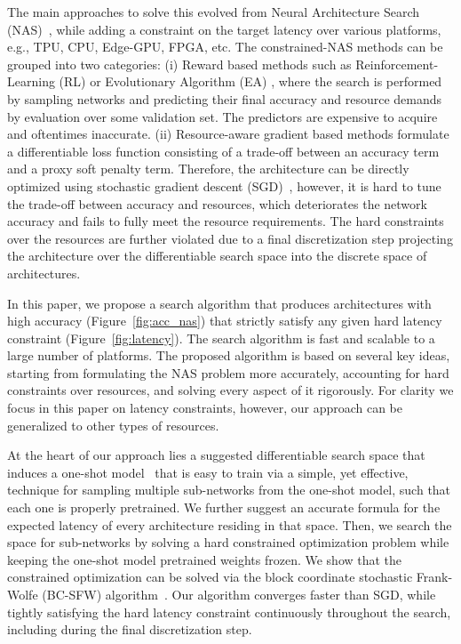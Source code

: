 \documentclass[dvipsnames,table,xcdraw]{article}
\begin{document}
The main approaches to solve this evolved from Neural Architecture Search (NAS)~\cite{zoph2016neural, liu2018darts, cai2018proxylessnas}, while adding a constraint on the target latency over various platforms, e.g., TPU, CPU, Edge-GPU, FPGA, etc. 
The constrained-NAS methods can be grouped into two categories: (i) Reward based methods such as Reinforcement-Learning (RL) or Evolutionary Algorithm (EA) \cite{OFA,tan2019mnasnet, effnet, mobilenetv3}, where the search is performed by sampling networks and predicting their final accuracy and resource demands by evaluation over some validation set. The predictors are expensive to acquire and oftentimes inaccurate. (ii) Resource-aware gradient based methods \cite{TF-NAS,fbnet} formulate a differentiable loss function consisting of a trade-off between an accuracy term and a proxy soft penalty term. Therefore, the architecture can be directly optimized using stochastic gradient descent (SGD)~\cite{SGD}, however, it is hard to tune the trade-off between accuracy and resources, which deteriorates the network accuracy and fails to fully meet the resource requirements. 
The hard constraints over the resources are further violated due to a final discretization step projecting the architecture over the differentiable search space into the discrete space of architectures.
 
In this paper, we propose a search algorithm that produces architectures with high accuracy (Figure~\ref{fig:acc_nas}) that strictly satisfy any given hard latency constraint (Figure~\ref{fig:latency}). The search algorithm is fast and scalable to a large number of platforms. The proposed algorithm is based on several key ideas, starting from formulating the NAS problem more accurately, accounting for hard constraints over resources, and solving every aspect of it rigorously. For clarity we focus in this paper on latency constraints, however, our approach can be generalized to other types of resources.

 At the heart of our approach lies a suggested differentiable search space that induces a one-shot model~\cite{bender2018understanding, fairnas, SPOS, OFA} that is easy to train via a simple, yet effective, technique for sampling multiple sub-networks from the one-shot model, such that each one is properly pretrained. 
 We further suggest an accurate formula for the expected latency of every architecture residing in that space. Then, we search the space for sub-networks by solving a hard constrained optimization problem while keeping the one-shot model pretrained weights frozen. We show that the constrained optimization can be solved via the block coordinate stochastic Frank-Wolfe (BC-SFW) algorithm~\cite{SFW,BCFW}. Our algorithm converges faster than SGD, while tightly satisfying the hard latency constraint continuously throughout the search, including during the final discretization step.
 
\end{document}
